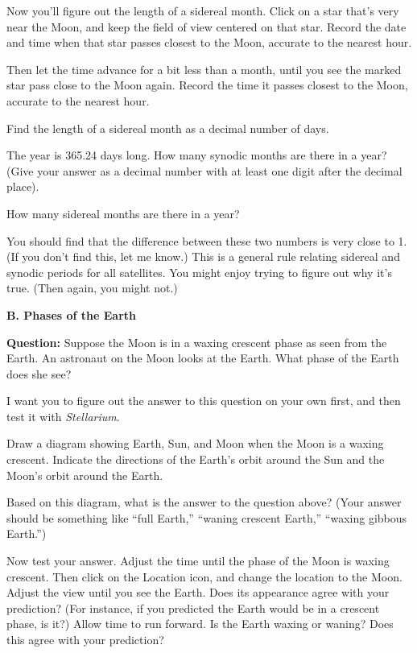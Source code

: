 \answerspace{1in}

\pagebreak[1]
Now you'll figure out the length of a sidereal month.  Click on a star
that's very near the Moon, and keep the field of view centered
on that star. Record the date and time
when that star passes closest to the Moon, accurate to the
nearest hour.  

\answerspace{1in}

Then let the time advance
for a bit less than a month, until you see the marked star pass close to the Moon
again.  Record the time it passes closest to the Moon, accurate
to the nearest hour.

\answerspace{1in}

Find the length of a sidereal month as a decimal number of days.

\answerspace{1in}

The year is 365.24 days long.  How many synodic months are there 
in a year? (Give your answer as a decimal number with at least one
digit after the decimal place).

\answerspace{1in}

How many sidereal months are there in a year?

\answerspace{1in}

You should find that the difference between these two numbers is
very close to 1.  (If you don't find this, let me know.)  This
is a general rule relating sidereal and synodic periods for
all satellites.  You might enjoy trying to figure out why
it's true.  (Then again, you might not.)

\bigskip

\pagebreak[1]

{\bf B. Phases of the Earth}

\medskip

{\bf Question:} 
Suppose the Moon is in a waxing crescent phase as seen from the
Earth.  An astronaut on the Moon looks at the Earth.  What
phase of the Earth does she see?

I want you to figure out the answer to this question on your
own first, and then test it with {\it Stellarium}.

Draw a diagram showing Earth, Sun, and Moon when the Moon is
a waxing crescent.  Indicate the directions of the Earth's orbit
around the Sun and the Moon's orbit around the Earth.

\answerspace{2in}

Based on this diagram, what is the answer to the question above?
(Your answer should be something like ``full Earth,'' ``waning
crescent Earth,'' ``waxing gibbous Earth.'')

\answerspace{1in}

Now test your answer.  Adjust the time until the phase of the Moon
is waxing crescent.  Then click on the Location icon, and
change the location to the Moon.
Adjust the view until you see the 
Earth.  Does its appearance agree with your prediction?  (For
instance, if you predicted the Earth would be in a crescent phase, is it?)
Allow time to run forward.  Is the Earth waxing or waning?
Does this agree with your prediction?

